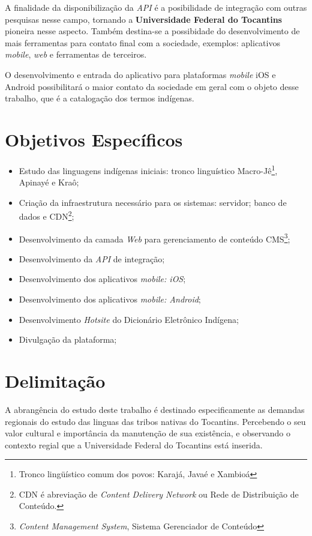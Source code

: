 \documentclass[journal]{IEEEtran}
\begin{document}
A finalidade da disponibilização da {\it API} é a posibilidade de integração com outras pesquisas nesse campo, tornando a {\bf Universidade Federal do Tocantins} pioneira nesse aspecto. Também destina-se a possibidade do desenvolvimento de mais ferramentas para contato final com a sociedade, exemplos: aplicativos {\it mobile}, {\it web} e ferramentas de terceiros.

O desenvolvimento e entrada do aplicativo para plataformas {\it mobile} iOS e Android possibilitará o maior contato da sociedade em geral com o objeto desse trabalho, que é a catalogação dos termos indígenas. 

\section{Objetivos Específicos}

\begin{itemize}
    \item Estudo das linguagens indígenas iniciais: tronco linguístico Macro-Jê\footnote{Tronco lingüístico comum dos povos: Karajá, Javaé e Xambioá}, Apinayé e Kraô;
    \item Criação da infraestrutura necessário para os sistemas: servidor; banco de dados e CDN\footnote{CDN é abreviação de {\it Content Delivery Network} ou Rede de Distribuição de Conteúdo. };
    \item Desenvolvimento da camada {\it Web} para gerenciamento de conteúdo CMS\footnote{{\it Content Management System}, Sistema Gerenciador de Conteúdo};
    \item Desenvolvimento da {\it API} de integração;
    \item Desenvolvimento dos aplicativos {\it mobile: iOS};
    \item Desenvolvimento dos aplicativos {\it mobile: Android};
    \item Desenvolvimento {\it Hotsite} do Dicionário Eletrônico Indígena;
    \item Divulgação da plataforma;
\end{itemize}

\section{Delimitação}

A abrangência do estudo deste trabalho é destinado especificamente as demandas regionais do estudo das linguas das tribos nativas do Tocantins. Percebendo o seu valor cultural e importância da manutenção de sua existência, e observando o contexto regial que a Universidade Federal do Tocantins está inserida.
\end{document}
